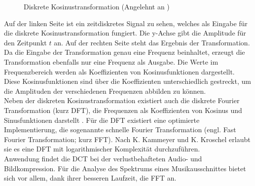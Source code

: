 \documentclass[11pt,a4paper]{article}
\begin{document}
\begin{figure}[!ht]
\centering
{}
\hspace{20pt}
\caption[Diskrete Kosinustransformation]{Diskrete Kosinustransformation (Angelehnt an \cite[S. 2]{KosTrans})}
\label{fig:KosinusTransformation}
\end{figure}
\noindent
Auf der linken Seite ist ein zeitdiskretes Signal zu sehen, welches als Eingabe für die diskrete Kosinustransformation fungiert. Die y-Achse gibt die Amplitude für den Zeitpunkt $t$ an. Auf der rechten Seite steht das Ergebnis der Transformation. Da die Eingabe der Transformation genau eine Frequenz beinhaltet, erzeugt die Transformation ebenfalls nur eine Frequenz als Ausgabe.
Die Werte im Frequenzbereich werden als Koeffizienten von Kosinusfunktionen dargestellt. Diese Kosinusfunktionen sind über die Koeffizienten unterschiedlich gestreckt, um die Amplituden der verschiedenen Frequenzen abbilden zu können.\\
Neben der diskreten Kosinustransformation existiert auch die diskrete Fourier Transformation (kurz DFT), die Frequenzen als Koeffizienten von Kosinus und Sinusfunktionen darstellt \cite[S. 185]{lerch2012introduction}. Für die DFT existiert eine optimierte Implementierung, die sogenannte schnelle Fourier Transformation (engl. Fast Fourier Transformation; kurz FFT). Nach K. Kammeyer und K. Kroschel \cite[S. 283]{kammeyer2013digitale} erlaubt sie es eine DFT mit logarithmischer Komplexität durchzuführen.\\
Anwendung findet die DCT bei der verlustbehafteten Audio- und Bildkompression. Für die Analyse des Spektrums eines Musikausschnittes bietet sich vor allem, dank ihrer besseren Laufzeit, die FFT an.
\end{document}
